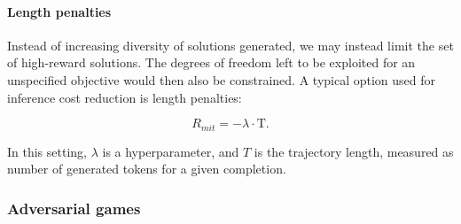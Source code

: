 



\paragraph{Length penalties}
Instead of increasing diversity of solutions generated, we may instead limit the set of high-reward solutions. The degrees of freedom left to be exploited for an unspecified objective would then also be constrained. A typical option used for inference cost reduction is length penalties:

\begin{equation}
    R_{mit} =  - \lambda\cdot\mathrm{T}.
\end{equation}

In this setting, $\lambda$ is a hyperparameter, and $T$ is the trajectory length, measured as number of generated tokens for a given completion.

\subsubsection{Adversarial games}

